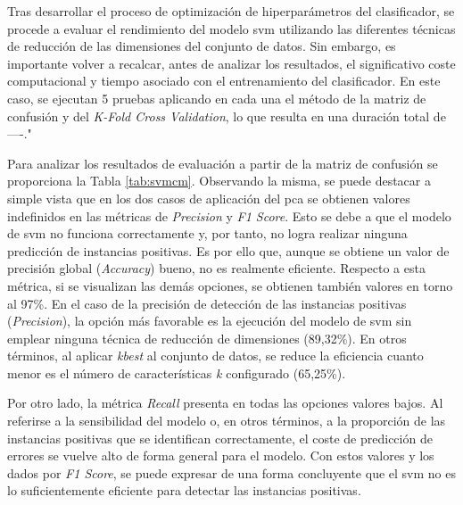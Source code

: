 Tras desarrollar el proceso de optimización de hiperparámetros del clasificador, se procede a evaluar el rendimiento del modelo \gls{svm} utilizando las diferentes técnicas de reducción de las dimensiones del conjunto de datos. Sin embargo, es importante volver a recalcar, antes de analizar los resultados, el significativo coste computacional y tiempo asociado con el entrenamiento del clasificador. En este caso, se ejecutan 5 pruebas aplicando en cada una el método de la matriz de confusión y del \textit{K-Fold Cross Validation}, lo que resulta en una duración total de ----."

\vspace{3mm}

Para analizar los resultados de evaluación a partir de la matriz de confusión se proporciona la Tabla \ref{tab:svmcm}. Observando la misma, se puede destacar a simple vista que en los dos casos de aplicación del \gls{pca} se obtienen valores indefinidos en las métricas de \textit{Precision} y \textit{F1 Score}. Esto se debe a que el modelo de \gls{svm} no funciona correctamente y, por tanto, no logra realizar ninguna predicción de instancias positivas. Es por ello que, aunque se obtiene un valor de precisión global (\textit{Accuracy}) bueno, no es realmente eficiente. Respecto a esta métrica, si se visualizan las demás opciones, se obtienen también valores en torno al 97\%. En el caso de la precisión de detección de las instancias positivas (\textit{Precision}), la opción más favorable es la ejecución del modelo de \gls{svm} sin emplear ninguna técnica de reducción de dimensiones (89,32\%). En otros términos, al aplicar \textit{kbest} al conjunto de datos, se reduce la eficiencia cuanto menor es el número de características \textit{k} configurado (65,25\%).

\vspace{3mm}

Por otro lado, la métrica \textit{Recall} presenta en todas las opciones valores  bajos. Al referirse a la sensibilidad del modelo o, en otros términos, a la proporción de las instancias positivas que se identifican correctamente, el coste de predicción de errores se vuelve alto de forma general para el modelo. Con estos valores y los dados por \textit{F1 Score}, se puede expresar de una forma concluyente que el \gls{svm} no es lo suficientemente eficiente para detectar las instancias positivas. 

\vspace{3mm}

